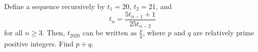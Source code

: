 Define a sequence recursively by $t_1 = 20$, $t_2 = 21$, and \[t_n = \frac{5t_{n-1} + 1}{25t_{n-2}}\] for all $n \ge 3$. Then, $t_{2020}$ can be written as $\frac{p}{q}$, where $p$ and $q$ are relatively prime positive integers. Find $p+q$.
